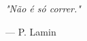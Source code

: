 \thispagestyle{empty}

\vspace*{\fill}

\begin{flushright}
    \begin{minipage}{7cm}
        \raggedleft
        
        \textit{"Não é só correr."} \\
        
        \vspace{0.5\baselineskip}
        
        --- P. Lamin
        
    \end{minipage}
\end{flushright}
\vspace*{5cm}